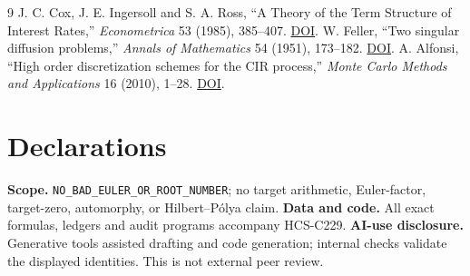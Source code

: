 \documentclass[10pt]{article}
\begin{document}
\begin{thebibliography}{9}
 J. C. Cox, J. E. Ingersoll and S. A. Ross, ``A Theory of the
Term Structure of Interest Rates,'' \emph{Econometrica} 53 (1985), 385--407.
\href{https://doi.org/10.2307/1911252}{DOI}.
 W. Feller, ``Two singular diffusion problems,''
\emph{Annals of Mathematics} 54 (1951), 173--182.
\href{https://doi.org/10.2307/1969318}{DOI}.
 A. Alfonsi, ``High order discretization schemes for the CIR
process,'' \emph{Monte Carlo Methods and Applications} 16 (2010), 1--28.
\href{https://doi.org/10.1090/S0025-5718-09-02252-2}{DOI}.
\end{thebibliography}

\section*{Declarations}
\textbf{Scope.} \nolinkurl{NO_BAD_EULER_OR_ROOT_NUMBER}; no target arithmetic,
Euler-factor, target-zero, automorphy, or Hilbert--Pólya claim.  \textbf{Data
and code.} All exact formulas, ledgers and audit programs accompany HCS-C229.
\textbf{AI-use disclosure.} Generative tools assisted drafting and code
generation; internal checks validate the displayed identities.  This is not
external peer review.
\end{document}
